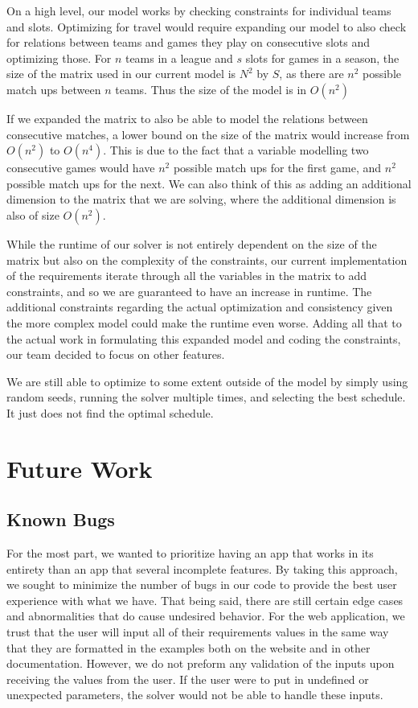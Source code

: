 \documentclass[book]{hmcclinic}
\begin{document}
On a high level, our model works by checking constraints for individual teams and slots. Optimizing for travel would require expanding our model to also check for relations between teams and games they play on consecutive slots and optimizing those. For $n$ teams in a league and $s$ slots for games in a season, the size of the matrix used in our current model is $N^2$ by $S$, as there are $n^2$ possible match ups between $n$ teams. Thus the size of the model is in $O(n^2)$

If we expanded the matrix to also be able to model the relations between consecutive matches, a lower bound on the size of the matrix would increase from $O(n^2)$ to $O(n^4)$. This is due to the fact that a variable modelling two consecutive games would have $n^2$ possible match ups for the first game, and $n^2$ possible match ups for the next. We can also think of this as adding an additional dimension to the matrix that we are solving, where the additional dimension is also of size $O(n^2)$.

While the runtime of our solver is not entirely dependent on the size of the matrix but also on the complexity of the constraints, our current implementation of the requirements iterate through all the variables in the matrix to add constraints, and so we are guaranteed to have an increase in runtime. The additional constraints regarding the actual optimization and consistency given the more complex model could make the runtime even worse. Adding all that to the actual work in formulating this expanded model and coding the constraints, our team decided to focus on other features. 

We are still able to optimize to some extent outside of the model by simply using random seeds, running the solver multiple times, and selecting the best schedule. It just does not find the optimal schedule. 



\chapter{Future Work}

\section{Known Bugs}
For the most part, we wanted to prioritize having an app that works in its entirety than an app that several incomplete features. By taking this approach, we sought to minimize the number of bugs in our code to provide the best user experience with what we have. That being said, there are still certain edge cases and abnormalities that do cause undesired behavior. 
For the web application, we trust that the user will input all of their requirements values in the same way that they are formatted in the examples both on the website and in other documentation. However, we do not preform any validation of the inputs upon receiving the values from the user. If the user were to put in undefined or unexpected parameters, the solver would not be able to handle these inputs.
\end{document}
